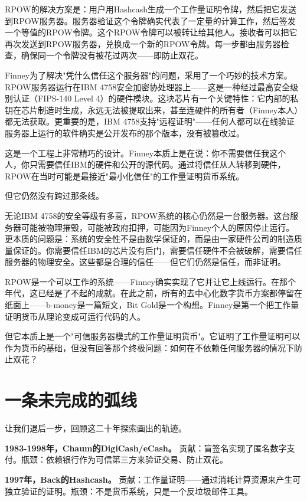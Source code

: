 \documentclass[a4paper,12pt,openany]{ctexbook}
\begin{document}
RPOW的解决方案是：用户用Hashcash生成一个工作量证明令牌，然后把它发送到RPOW服务器。服务器验证这个令牌确实代表了一定量的计算工作，然后签发一个等值的RPOW令牌。这个RPOW令牌可以被转让给其他人。接收者可以把它再次发送到RPOW服务器，兑换成一个新的RPOW令牌。每一步都由服务器检查，确保同一个令牌没有被花过两次——即防止双花。

Finney为了解决"凭什么信任这个服务器"的问题，采用了一个巧妙的技术方案。RPOW服务器运行在IBM 4758安全加密协处理器上——这是一种经过最高安全级别认证（FIPS-140 Level 4）的硬件模块。这块芯片有一个关键特性：它内部的私钥在芯片制造时生成，永远无法被提取出来，甚至连硬件的所有者（Finney本人）都无法获取。更重要的是，IBM 4758支持"远程证明"——任何人都可以在线验证服务器上运行的软件确实是公开发布的那个版本，没有被篡改过。

这是一个工程上非常精巧的设计。Finney本质上是在说：你不需要信任我这个人，你只需要信任IBM的硬件和公开的源代码。通过将信任从人转移到硬件，RPOW在当时可能是最接近"最小化信任"的工作量证明货币系统。

但它仍然没有跨过那条线。

无论IBM 4758的安全等级有多高，RPOW系统的核心仍然是一台服务器。这台服务器可能被物理摧毁，可能被政府扣押，可能因为Finney个人的原因停止运行。更本质的问题是：系统的安全性不是由数学保证的，而是由一家硬件公司的制造质量保证的。你需要信任IBM的芯片没有后门，需要信任硬件不会被破解，需要信任服务器的物理安全。这些都是合理的信任——但它们仍然是信任，而非证明。

RPOW是一个可以工作的系统——Finney确实实现了它并让它上线运行。在那个年代，这已经是了不起的成就。在此之前，所有的去中心化数字货币方案都停留在纸面上——b-money是一篇短文，Bit Gold是一个构想。Finney是第一个把工作量证明货币从理论变成可运行代码的人。

但它本质上是一个"可信服务器模式的工作量证明货币"。它证明了工作量证明可以作为货币的基础，但没有回答那个终极问题：如何在不依赖任何服务器的情况下防止双花？


\section*{一条未完成的弧线}


让我们退后一步，回顾这二十年探索画出的轨迹。

\textbf{1983-1998年，Chaum的DigiCash/eCash。} 贡献：盲签名实现了匿名数字支付。瓶颈：依赖银行作为可信第三方来验证交易、防止双花。

\textbf{1997年，Back的Hashcash。} 贡献：工作量证明——通过消耗计算资源来产生可独立验证的证明。瓶颈：不是货币系统，只是一个反垃圾邮件工具。
\end{document}

